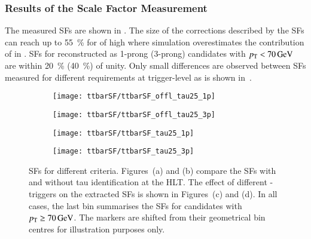 \subsubsection{Results of the Scale Factor Measurement}

The measured \faketauhadvis SFs are shown in .
The size of the corrections described by the SFs can reach up to
\SI{55}{\percent} for \faketauhadvis of high \pT where simulation overestimates
the contribution of \faketauhadvis in \ttbar. SFs for \faketauhadvis
reconstructed as 1-prong (3-prong) candidates with $\pT < \SI{70}{\GeV}$ are
within \SI{20}{\percent} (\SI{40}{\percent}) of unity. Only small differences
are observed between SFs measured for different \tauid requirements at
trigger-level as is shown
in~.

\begin{figure}[htbp]
  \centering

  \begin{subfigure}[t]{.495\textwidth}
    \texttt{[image: ttbarSF/ttbarSF\_offl\_tau25\_1p]}
    \caption{}
    \label{fig:ttbarSF_postfit_SF_a}
  \end{subfigure}\hfill%
  \begin{subfigure}[t]{.495\textwidth}
    \texttt{[image: ttbarSF/ttbarSF\_offl\_tau25\_3p]}
    \caption{}
    \label{fig:ttbarSF_postfit_SF_b}
  \end{subfigure}

  \begin{subfigure}[t]{.495\textwidth}
    \texttt{[image: ttbarSF/ttbarSF\_tau25\_1p]}
    \caption{}
    \label{fig:ttbarSF_postfit_SF_c}
  \end{subfigure}\hfill%
  \begin{subfigure}[t]{.495\textwidth}
    \texttt{[image: ttbarSF/ttbarSF\_tau25\_3p]}
    \caption{}
    \label{fig:ttbarSF_postfit_SF_d}
  \end{subfigure}

  \caption[\Faketauhadvis SFs for different \tauid criteria.]{\Faketauhadvis SFs
    for different \tauid criteria. Figures~(a) and (b) compare the SFs with and
    without tau identification at the HLT. The effect of different
    \tauhadvis-triggers on the extracted SFs is shown in Figures~(c) and (d). In
    all cases, the last bin summarises the SFs for \tauhadvis candidates with
    $\pT \geq \SI{70}{\GeV}$. The markers are shifted from their geometrical bin
    centres for illustration purposes only.}%
  \label{fig:ttbarSF_postfit_SF}
\end{figure}


